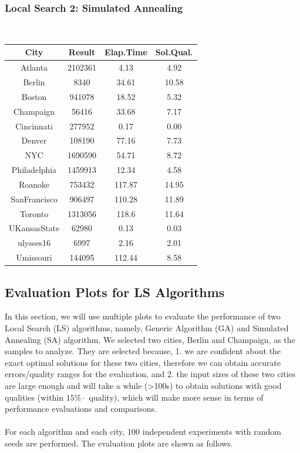 \subsubsection{Local Search 2: Simulated Annealing}
\hfill\\
\begin{center}
\begin{tabular}{ |c|c|c|c| } 
 \hline
 City         & Result  & Elap.Time & Sol.Qual. \\
 \hline
Atlanta      & 2102361 & 4.13      & 4.92      \\
Berlin       & 8340    & 34.61     & 10.58     \\
Boston       & 941078  & 18.52     & 5.32      \\
Champaign    & 56416   & 33.68     & 7.17      \\
Cincinnati   & 277952  & 0.17      & 0.00      \\
Denver       & 108190  & 77.16     & 7.73      \\
NYC          & 1690590 & 54.71     & 8.72      \\
Philadelphia & 1459913 & 12.34     & 4.58      \\
Roanoke      & 753432  & 117.87    & 14.95     \\
SanFrancisco & 906497  & 110.28    & 11.89     \\
Toronto      & 1313056 & 118.6     & 11.64     \\
UKansasState & 62980   & 0.13      & 0.03      \\
ulysses16    & 6997    & 2.16      & 2.01      \\
Umissouri    & 144095  & 112.44    & 8.58     \\
\hline
\end{tabular}
\end{center}

\subsection{Evaluation Plots for LS Algorithms}
In this section, we will use multiple plots to evaluate the performance of two Local Search (LS) algorithms, namely, Generic Algorithm (GA) and Simulated Annealing (SA) algorithm. We selected two cities, Berlin and Champaign, as the samples to analyze. They are selected because, 1. we are confident about the exact optimal solutions for these two cities, therefore we can obtain accurate errors/quality ranges for the evaluation, and 2. the input sizes of these two cities are large enough and will take a while (>100s) to obtain solutions with good qualities (within $15\% \cdot$ quality), which will make more sense in terms of performance evaluations and comparisons.\\
\hfill\\
For each algorithm and each city, 100 independent experiments with random seeds are performed. The evaluation plots are shown as follows.

